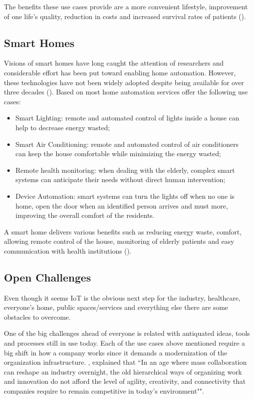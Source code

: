 The benefits these use cases provide are a more convenient lifestyle, improvement of one life's quality, reduction in costs and increased survival rates of patients (\cite{iot-healthcare}).

\subsection{Smart Homes}
\label{subsec:stateofart:areas:home}

Visions of smart homes have long caught the attention of researchers and considerable effort has been put toward enabling home automation. However, these technologies have not been widely adopted despite being available for over three decades (\cite{iot-smarthomes}).
Based on \cite{smarthome-review} most home automation services offer the following use cases:

\begin{itemize}
    \item Smart Lighting: remote and automated control of lights inside a house can help to decrease energy wasted;
    \item Smart Air Conditioning: remote and automated control of air conditioners can keep the house comfortable while minimizing the energy wasted;
    \item Remote health monitoring: when dealing with the elderly, complex smart systems can anticipate their needs without direct human intervention;
    \item Device Automation: smart systems can turn the lights off when no one is home, open the door when an identified person arrives and must more, improving the overall comfort of the residents.
\end{itemize}

A smart home delivers various benefits such as reducing energy waste, comfort, allowing remote control of the house, monitoring of elderly patients and easy communication with health institutions (\cite{smarthome-review}).

\subsection{Open Challenges}
\label{subsec:stateofart:arch:challenges}

Even though it seems \gls{IoT} is the obvious next step for the industry, healthcare, everyone's home, public spaces/services and everything else there are some obstacles to overcome.

One of the big challenges ahead of everyone is related with antiquated ideas, tools and processes still in use today.
Each of the use cases above mentioned require a big shift in how a company works since it demands a modernization of the organization infrastructure.
\cite{tapscott2006wikinomics}, explained that ``In an age where mass collaboration can reshape an industry overnight, the old hierarchical ways of organizing work and innovation do not afford the level of agility, creativity, and connectivity that companies require to remain competitive in today's environment"".

